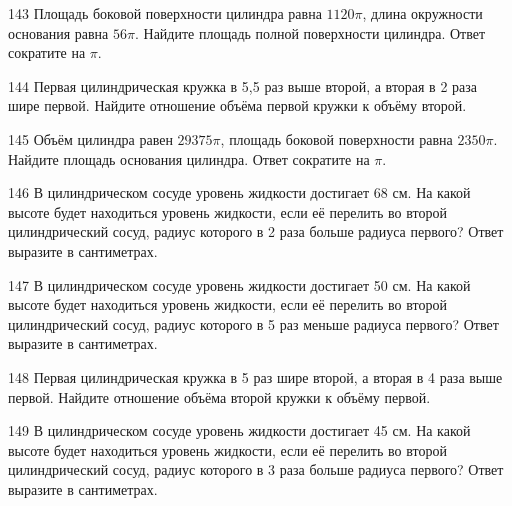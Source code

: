 \documentclass[4apaper]{article}
\begin{document}
\begin{taskBN}{143}
Площадь боковой поверхности цилиндра равна $1120\pi$, длина окружности основания равна $56\pi$. Найдите площадь полной поверхности цилиндра. Ответ сократите на $\pi$.
\end{taskBN}

\begin{taskBN}{144}
 Первая цилиндрическая кружка в 5,5 раз выше второй, а вторая в 2 раза шире первой. Найдите отношение объёма первой кружки к объёму второй.
\end{taskBN}

\begin{taskBN}{145}
Объём цилиндра равен $29375\pi$, площадь боковой поверхности равна $2350\pi$. Найдите площадь основания цилиндра. Ответ сократите на $\pi$.
\end{taskBN}

\begin{taskBN}{146}
В цилиндрическом сосуде уровень жидкости достигает 68 см. На какой высоте будет находиться уровень жидкости, если её перелить во второй цилиндрический сосуд, радиус которого в 2 раза больше радиуса первого? Ответ выразите в сантиметрах.
\end{taskBN}

\begin{taskBN}{147}
В цилиндрическом сосуде уровень жидкости достигает 50 см. На какой высоте будет находиться уровень жидкости, если её перелить во второй цилиндрический сосуд, радиус которого в 5 раз меньше радиуса первого? Ответ выразите в сантиметрах.
\end{taskBN}

\begin{taskBN}{148}
 Первая цилиндрическая кружка в 5 раз шире второй, а вторая в 4 раза выше первой. Найдите отношение объёма второй кружки к объёму первой.
\end{taskBN}

\begin{taskBN}{149}
В цилиндрическом сосуде уровень жидкости достигает 45 см. На какой высоте будет находиться уровень жидкости, если её перелить во второй цилиндрический сосуд, радиус которого в 3 раза больше радиуса первого? Ответ выразите в сантиметрах.
\end{taskBN}
\end{document}
